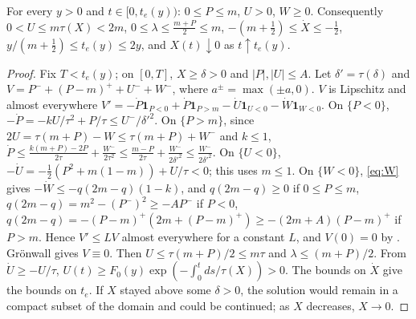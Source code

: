 \documentclass[11pt,a4paper]{report}
\begin{document}
\begin{lemma}\label{lem:region}
For every \(y>0\) and \(t\in[0,t_e(y))\): \(0\le P\le m\), \(U>0\), \(W\ge0\). Consequently
\(0<U\le m\tau(X)<2m\), \(0\le\lambda\le\frac{m+P}2\le m\), \(-(m+\frac12)\le\dot X\le-\frac12\),
\(y/(m+\frac12)\le t_e(y)\le2y\), and \(X(t)\downarrow0\) as \(t\uparrow t_e(y)\).
\end{lemma}
\begin{proof}
Fix \(T<t_e(y)\); on \([0,T]\), \(X\ge\delta>0\) and \(|P|,|U|\le A\). Let \(\delta'=\tau(\delta)\) and
\(V=P^-+(P-m)^++U^-+W^-\), where \(a^\pm=\max(\pm a,0)\). \(V\) is Lipschitz and almost everywhere
\(V'=-\dot P\mathbf 1_{P<0}+\dot P\mathbf 1_{P>m}-\dot U\mathbf 1_{U<0}-\dot W\mathbf 1_{W<0}\). On
\(\{P<0\}\), \(-\dot P=-kU/\tau^2+P/\tau\le U^-/\delta'^2\). On \(\{P>m\}\), since
\(2U=\tau(m+P)-W\le\tau(m+P)+W^-\) and \(k\le1\),
\(\dot P\le\frac{k(m+P)-2P}{2\tau}+\frac{W^-}{2\tau^2}\le\frac{m-P}{2\tau}+\frac{W^-}{2\delta'^2}\le\frac{W^-}{2\delta'^2}\).
On \(\{U<0\}\), \(-\dot U=-\frac12(P^2+m(1-m))+U/\tau<0\); this uses \(m\le1\). On \(\{W<0\}\),
\eqref{eq:W} gives \(-\dot W\le-q(2m-q)(1-k)\), and \(q(2m-q)\ge0\) if \(0\le P\le m\),
\(q(2m-q)=m^2-(P^-)^2\ge-AP^-\) if \(P<0\), \(q(2m-q)=-(P-m)^+(2m+(P-m)^+)\ge-(2m+A)(P-m)^+\) if \(P>m\).
Hence \(V'\le LV\) almost everywhere for a constant \(L\), and \(V(0)=0\) by . Grönwall gives
\(V\equiv0\). Then \(U\le\tau(m+P)/2\le m\tau\) and \(\lambda\le(m+P)/2\). From \(\dot U\ge-U/\tau\),
\(U(t)\ge F_0(y)\exp(-\int_0^t ds/\tau(X))>0\). The bounds on \(\dot X\) give the bounds on \(t_e\). If \(X\)
stayed above some \(\delta>0\), the solution would remain in a compact subset of the domain and could be
continued; as \(X\) decreases, \(X\to0\).
\end{proof}
\end{document}
